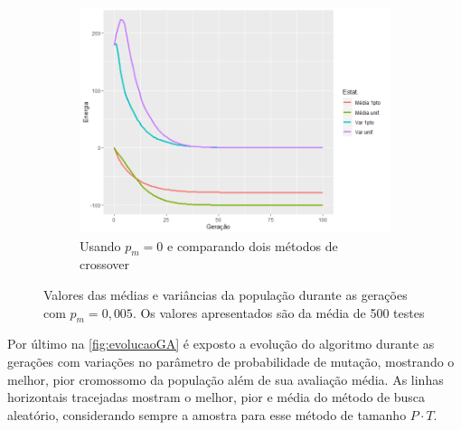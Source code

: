 \begin{figure}[ht]
\begin{subfigure}[b]{0.67\linewidth}
		\includegraphics[width=\linewidth]{imagens/comp_cross_1pto_unif.png}
		\caption{Usando \(p_m = 0\) e comparando dois métodos de crossover}
	\end{subfigure}
\caption{Valores das médias e variâncias da população durante as gerações com \(p_m=0,005\). Os valores apresentados são da média de 500 testes}
	\label{fig:distribuicao_ising_geracoes}
\end{figure}

Por último na \autoref{fig:evolucaoGA} é exposto a evolução do algoritmo durante as gerações com variações no parâmetro de probabilidade de mutação, mostrando o melhor, pior cromossomo da população além de sua avaliação média. As linhas horizontais tracejadas mostram o melhor, pior e média do método de busca aleatório, considerando sempre a amostra para esse método de tamanho \(P \cdot T\).

